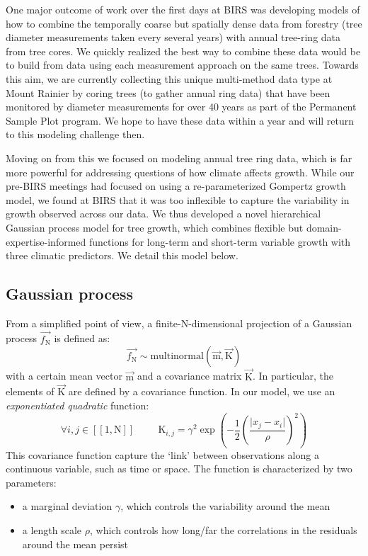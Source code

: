One major outcome of work over the first days at BIRS was developing models of how to combine the temporally coarse but spatially dense data from forestry (tree diameter measurements taken every several years) with annual tree-ring data from tree cores. We quickly realized the best way to combine these data would be to build from data using each measurement approach on the same trees. Towards this aim, we are currently collecting this unique multi-method data type at Mount Rainier by coring trees (to gather annual ring data) that have been monitored by diameter measurements for over 40 years as part of the Permanent Sample Plot program. We hope to have these data within a year and will return to this modeling challenge then. 

Moving on from this we focused on modeling annual tree ring data, which is far more powerful for addressing questions of how climate affects growth. While our pre-BIRS meetings had focused on using a re-parameterized Gompertz growth model, we found at BIRS that it was too inflexible to capture the variability in growth observed across our data. We thus developed a novel hierarchical Gaussian process model for tree growth, which combines flexible but domain-expertise-informed functions for long-term and short-term variable growth with three climatic predictors. We detail this model below. 

\subsection{Gaussian process}

From a simplified point of view, a finite-$\mathrm{N}$-dimensional projection of a Gaussian process $\vec{f_\mathrm{N}}$ is defined as:
$$\vec{f_\mathrm{N}} \sim \text{multinormal}(\vec{\mathrm{m}}, \vec{\mathrm{K}})$$
with a certain mean vector $\vec{\mathrm{m}}$ and a covariance matrix $\vec{\mathrm{K}}$.  
In particular, the elements of $\vec{\mathrm{K}}$ are defined by a covariance function.   
In our model, we use an \emph{exponentiated quadratic} function:  
$$\forall i,j  \in [\![1,\mathrm{N}]\!] \hspace{1cm} \mathrm{K}_{i,j} = {\gamma^2} \exp\left(-\frac{1}{2}\left(\frac{\lvert x_j-x_i \rvert }{\rho}\right)^2\right)$$
This covariance function capture the `link' between observations along a continuous variable, such as time or space.   
The function is characterized by two parameters: 
\begin{itemize}
    \item a marginal deviation $\gamma$, which controls the variability around the mean 
    \item a length scale $\rho$, which controls how long/far the correlations in the residuals around the mean persist
\end{itemize}


